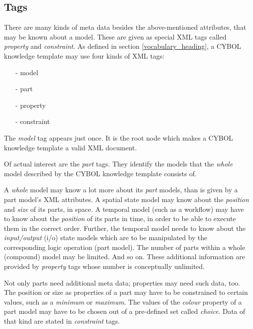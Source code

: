 %
%
%
%
%
%

\subsection{Tags}
\label{tags_heading}

There are many kinds of meta data besides the above-mentioned attributes, that
may be known about a model. These are given as special XML tags called
\emph{property} and \emph{constraint}. As defined in section
\ref{vocabulary_heading}, a CYBOL knowledge template may use four kinds of XML
tags:

\begin{itemize}
    \item[-] model
    \item[-] part
    \item[-] property
    \item[-] constraint
\end{itemize}

The \emph{model} tag appears just once. It is the root node which makes a CYBOL
knowledge template a valid XML document.

Of actual interest are the \emph{part} tags. They identify the models that the
\emph{whole} model described by the CYBOL knowledge template consists of.

A \emph{whole} model may know a lot more about its \emph{part} models, than is
given by a part model's XML attributes. A spatial state model may know about
the \emph{position} and \emph{size} of its parts, in space. A temporal model
(such as a workflow) may have to know about the \emph{position} of its parts in
time, in order to be able to execute them in the correct order. Further, the
temporal model needs to know about the \emph{input/output} (i/o) state models
which are to be manipulated by the corresponding logic operation (part model).
The number of parts within a whole (compound) model may be limited. And so on.
These additional information are provided by \emph{property} tags whose number
is conceptually unlimited.

Not only parts need additional meta data; properties may need such data, too.
The position or size as properties of a part may have to be constrained to
certain values, such as a \emph{minimum} or \emph{maximum}. The values of the
\emph{colour} property of a part model may have to be chosen out of a
pre-defined set called \emph{choice}. Data of that kind are stated in
\emph{constraint} tags.
